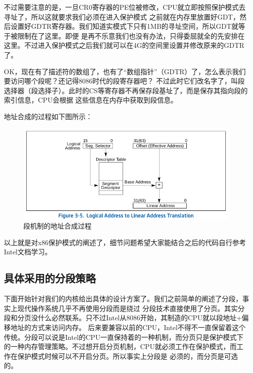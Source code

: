 \par 不过需要注意的是，一旦CR0寄存器的PE位被修改，CPU就立即按照保护模式去寻址了，所以这就要求我们必须在进入保护模式\allowbreak
之前就在内存里放置好GDT，然后设置好GDTR寄存器。我们知道实模式下只有1MB的寻址空间，所以GDT就等于被限制在了这里。即便\allowbreak
是再不乐意我们也没有办法，只得委屈就全的先安排在这里。不过进入保护模式之后我们就可以在4G的空间里设置并修改原来的GDTR了。

\par OK，现在有了描述符的数组了，也有了“数组指针”（GDTR）了，怎么表示我们要访问哪个段呢？还记得8086时代的段寄存器吧？\allowbreak
不过此时它们改名字了，叫段选择器（段选择子）。此时的CS等寄存器不再保存段基址了，而是保存其指向段的索引信息，CPU会根据\allowbreak
这些信息在内存中获取到段信息。

\par 地址合成的过程如下图所示：

\begin{figure}[ht]
      \centering
      \includegraphics[scale=0.5]{picture/chapt6/protected_segment_addr.png}
      \caption{段机制的地址合成过程}
\end{figure}

\par 以上就是对x86保护模式的阐述了，细节问题希望大家能结合之后的代码自行参考Intel文档学习。

\subsection{具体采用的分段策略}

\par 下面开始针对我们的内核给出具体的设计方案了。我们之前简单的阐述了分段，事实上现代操作系统几乎不再使用分段而是绕过\allowbreak
分段技术直接使用了分页。其实分段和分页没什么必然联系。只不过Intel从8086开始，其制造的CPU就以段地址+偏移地址的方式来访问内存。\allowbreak
后来要兼容以前的CPU，Intel不得不一直保留着这个传统。分段可以说是Intel的CPU一直保持着的一种机制，而分页只是保护模式下\allowbreak
的一种内存管理策略。不过想开启分页机制，CPU就必须工作在保护模式，而工作在保护模式时候可以不开启分页。所以事实上分段是\allowbreak
必须的，而分页是可选的。


